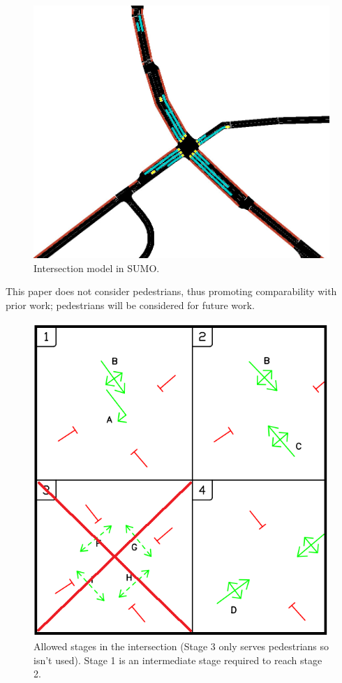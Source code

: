 \documentclass[conference]{IEEEtran}
\begin{document}
\begin{figure}[thpb]
    \centering
    \includegraphics[width=\linewidth]{figures/intersection.png}
    \caption{Intersection model in SUMO.}
    \label{fig:intersection}
\end{figure}

This paper does not consider pedestrians, thus promoting comparability with prior work; pedestrians will be considered for future work. 
\begin{figure}[thpb]
    \centering
    \includegraphics[width=\linewidth]{figures/phases_noped.png}
    \caption{Allowed stages in the intersection (Stage 3 only serves pedestrians so isn't used). Stage 1 is an intermediate stage required to reach stage 2.}
    \label{fig:phases}
\end{figure}
\end{document}
